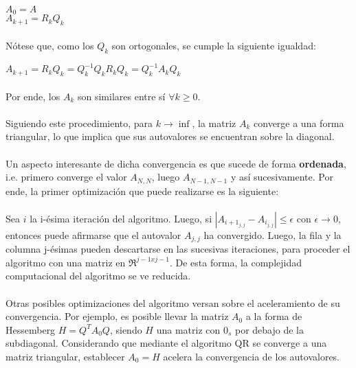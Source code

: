 \documentclass[12pt, twocolumn]{article}
\begin{document}
	\begin{center}
		$A_{0} = A$ \\
		$A_{k+1} = R_{k}Q_{k}$
	\end{center}
	
	\paragraph{} Nótese que, como los $Q_{k}$ son ortogonales, se cumple la siguiente igualdad:
	
	\begin{center}
		$A_{k+1} = R_{k}Q_{k} = Q^{-1}_{k}Q_{k}R_{k}Q_{k} = Q^{-1}_{k}A_{k}Q_{k}$
	\end{center}
	
	\paragraph{} Por ende, los $A_{k}$ son similares entre sí $\forall k\ge0$.
	
	\paragraph{} Siguiendo este procedimiento, para $k\to\inf$, la matriz $A_{k}$ converge a una forma triangular, lo que implica que sus autovalores se encuentran sobre la diagonal.
	
	\paragraph{} Un aspecto interesante de dicha convergencia es que sucede de forma \textbf{ordenada}, i.e. primero converge el valor $A_{N,N}$, luego $A_{N-1,N-1}$ y así sucesivamente. Por ende, la primer optimización que puede realizarse es la siguiente: 
	
	\paragraph{} Sea $i$ la i-ésima iteración del algoritmo. Luego, si $|A_{i+1_{j,j}} -A_{i_{j,j}}| \le \epsilon$ con $\epsilon \to 0$, entonces puede afirmarse que el autovalor $A_{j,j}$ ha convergido. Luego, la fila y la columna j-ésimas pueden descartarse en las sucesivas iteraciones, para proceder el algoritmo con una matriz en $\Re^{j-1xj-1}$. De esta forma, la complejidad computacional del algoritmo se ve reducida.
	
	\paragraph{} Otras posibles optimizaciones del algoritmo versan sobre el aceleramiento de su convergencia. Por ejemplo, es posible llevar la matriz $A_{0}$ a la forma de Hessemberg $H = Q^{T}A_{0}Q$, siendo $H$ una matriz con $0_{s}$ por debajo de la subdiagonal. Considerando que mediante el algoritmo QR se converge a una matriz triangular, establecer $A_{0} = H$ acelera la convergencia de los autovalores.
	
\end{document}
